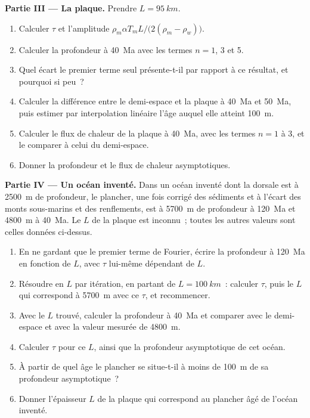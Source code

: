 \begin{problem}
\medskip\noindent\textbf{Partie III --- La plaque.} Prendre $L = \qty{95}{km}$.
\begin{enumerate}[resume]
  \item Calculer $\tau$ et l'amplitude $\rho_m\alpha T_mL/\bigl(2(\rho_m -
        \rho_w)\bigr)$.
  \item Calculer la profondeur à \qty{40}{Ma} avec les termes $n = 1$, 3 et 5.
  \item Quel écart le premier terme seul présente-t-il par rapport à ce résultat, et
        pourquoi si peu~?
  \item Calculer la différence entre le demi-espace et la plaque à \qty{40}{Ma} et
        \qty{50}{Ma}, puis estimer par interpolation linéaire l'âge auquel elle
        atteint \qty{100}{m}.
  \item Calculer le flux de chaleur de la plaque à \qty{40}{Ma}, avec les termes
        $n = 1$ à 3, et le comparer à celui du demi-espace.
  \item Donner la profondeur et le flux de chaleur asymptotiques.
\end{enumerate}

\medskip\noindent\textbf{Partie IV --- Un océan inventé.} Dans un océan inventé
dont la dorsale est à \qty{2500}{m} de profondeur, le plancher, une fois corrigé des
sédiments et à l'écart des monts sous-marins et des renflements, est à \qty{5700}{m} de profondeur à \qty{120}{Ma} et
\qty{4800}{m} à \qty{40}{Ma}. Le $L$ de la plaque est inconnu~; toutes les autres
valeurs sont celles données ci-dessus.
\begin{enumerate}[resume]
  \item En ne gardant que le premier terme de Fourier, écrire la profondeur à
        \qty{120}{Ma} en fonction de $L$, avec $\tau$ lui-même dépendant de
        $L$.
  \item Résoudre en $L$ par itération, en partant de $L = \qty{100}{km}$~: calculer
        $\tau$, puis le $L$ qui correspond à \qty{5700}{m} avec ce $\tau$, et
        recommencer.
  \item Avec le $L$ trouvé, calculer la profondeur à \qty{40}{Ma} et comparer
        avec le demi-espace et avec la valeur mesurée de \qty{4800}{m}.
  \item Calculer $\tau$ pour ce $L$, ainsi que la profondeur asymptotique de cet océan.
  \item À partir de quel âge le plancher se situe-t-il à moins de \qty{100}{m} de sa
        profondeur asymptotique~?
  \item Donner l'épaisseur $L$ de la plaque qui correspond au plancher âgé de l'océan
        inventé.
\end{enumerate}
\end{problem}
